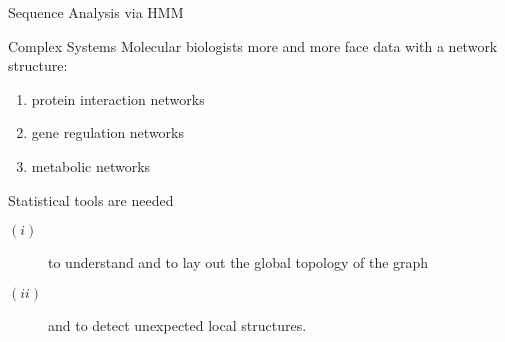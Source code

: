 \documentclass[pdf,mia,noFooter,slideColor,colorBG]{prosper}
\begin{document}
\begin{slide}{Sequence Analysis via HMM}
\end{slide}


\begin{slide}{Complex Systems}
Molecular biologists more and more face data with a network
structure:
\begin{enumerate}
\item protein interaction networks
\item gene regulation networks
\item metabolic networks
\end{enumerate}

Statistical tools are needed
\begin{description}
\item[$(i)$] to understand and to lay out the global topology
of the graph \\
\item[$(ii)$] and to detect unexpected local structures.
\end{description}
\end{slide}
\end{document}
